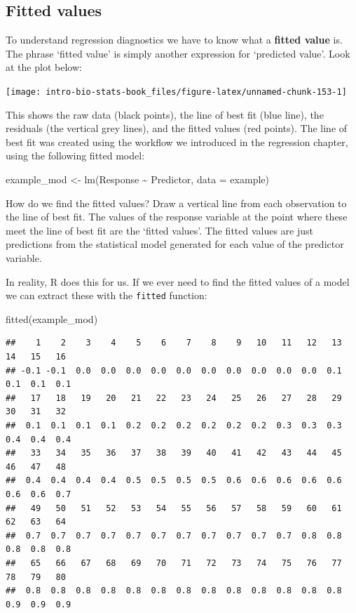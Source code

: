 \documentclass[
]{book}
\newenvironment{Shaded}{\begin{snugshade}}{\end{snugshade}}
\newcommand{\AttributeTok}[1]{\textcolor[rgb]{0.77,0.63,0.00}{#1}}
\newcommand{\FunctionTok}[1]{\textcolor[rgb]{0.00,0.00,0.00}{#1}}
\newcommand{\NormalTok}[1]{#1}
\newcommand{\OtherTok}[1]{\textcolor[rgb]{0.56,0.35,0.01}{#1}}
\newcommand{\SpecialCharTok}[1]{\textcolor[rgb]{0.00,0.00,0.00}{#1}}
\begin{document}
\hypertarget{fitted-values}{%
\subsection{Fitted values}\label{fitted-values}}

To understand regression diagnostics we have to know what a \textbf{fitted value} is. The phrase `fitted value' is simply another expression for `predicted value'. Look at the plot below:

\begin{center}\texttt{[image: intro-bio-stats-book\_files/figure-latex/unnamed-chunk-153-1]} \end{center}

This shows the raw data (black points), the line of best fit (blue line), the residuals (the vertical grey lines), and the fitted values (red points). The line of best fit was created using the workflow we introduced in the regression chapter, using the following fitted model:

\begin{Shaded}
\begin{Highlighting}[]
\NormalTok{example\_mod }\OtherTok{\textless{}{-}} \FunctionTok{lm}\NormalTok{(Response }\SpecialCharTok{\textasciitilde{}}\NormalTok{ Predictor, }\AttributeTok{data =}\NormalTok{ example)}
\end{Highlighting}
\end{Shaded}

How do we find the fitted values? Draw a vertical line from each observation to the line of best fit. The values of the response variable at the point where these meet the line of best fit are the `fitted values'. The fitted values are just predictions from the statistical model generated for each value of the predictor variable.

In reality, R does this for us. If we ever need to find the fitted values of a model we can extract these with the \texttt{fitted} function:

\begin{Shaded}
\begin{Highlighting}[]
\FunctionTok{fitted}\NormalTok{(example\_mod)}
\end{Highlighting}
\end{Shaded}

\begin{verbatim}
##    1    2    3    4    5    6    7    8    9   10   11   12   13   14   15   16 
## -0.1 -0.1  0.0  0.0  0.0  0.0  0.0  0.0  0.0  0.0  0.0  0.0  0.1  0.1  0.1  0.1 
##   17   18   19   20   21   22   23   24   25   26   27   28   29   30   31   32 
##  0.1  0.1  0.1  0.1  0.2  0.2  0.2  0.2  0.2  0.2  0.3  0.3  0.3  0.4  0.4  0.4 
##   33   34   35   36   37   38   39   40   41   42   43   44   45   46   47   48 
##  0.4  0.4  0.4  0.4  0.5  0.5  0.5  0.5  0.6  0.6  0.6  0.6  0.6  0.6  0.6  0.7 
##   49   50   51   52   53   54   55   56   57   58   59   60   61   62   63   64 
##  0.7  0.7  0.7  0.7  0.7  0.7  0.7  0.7  0.7  0.7  0.7  0.8  0.8  0.8  0.8  0.8 
##   65   66   67   68   69   70   71   72   73   74   75   76   77   78   79   80 
##  0.8  0.8  0.8  0.8  0.8  0.8  0.8  0.8  0.8  0.8  0.8  0.8  0.8  0.9  0.9  0.9
\end{verbatim}
\end{document}
